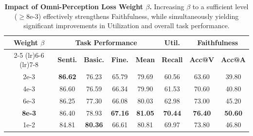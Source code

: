 \documentclass{article}
\theoremstyle{plain}
\theoremstyle{definition}
\theoremstyle{remark}
\begin{document}
\begin{table}[t]
\centering

\fontsize{8.0}{10}\selectfont 
\renewcommand{\arraystretch}{1.2}
\setlength{\tabcolsep}{3.2pt}

\caption{\textbf{Impact of Omni-Perception Loss Weight $\beta$.} Increasing $\beta$ to a sufficient level ($\ge 8\text{e-}3$) effectively strengthens Faithfulness, while simultaneously yielding significant improvements in Utilization and overall task performance.}
\label{tab:ablation_beta}

\begin{tabular}{c c c c c c c c}
    \toprule

    \multirow{2}{*}{\textbf{Weight $\beta$}} 
    & \multicolumn{4}{c}{\textbf{Task Performance}} 
    & \textbf{Util.} 
    & \multicolumn{2}{c}{\textbf{Faithfulness}} \\
    \cmidrule(lr){2-5}
    \cmidrule(lr){6-6}
    \cmidrule(lr){7-8}
    
    & \textbf{Senti.} 
    & \textbf{Basic.} 
    & \textbf{Fine.} 
    & \textbf{Mean} 
    & \textbf{Recall} 
    & \textbf{Acc@V} 
    & \textbf{Acc@A} \\
    \midrule
    
    2e-3  & \textbf{86.62} & 76.23 & 65.79 & 79.69 & 60.56 & 63.60 & 39.80  \\
    4e-3  & 86.60 & 76.59 & 66.34 & 79.90 & 61.53 & 70.60 & 40.80  \\
    6e-3  & 86.25 & 77.30 & 66.08 & 80.03 & 62.98 & 73.00 & 45.20  \\
    
    \rowcolor{tabhighlight} 
    \textbf{8e-3} & 86.40 & 78.93 & \textbf{67.16} & \textbf{81.05} & \textbf{70.44} & \textbf{76.40} & \textbf{50.60} \\
    
    1e-2  & 84.81 & \textbf{80.36} & 66.61 & 80.81 & 69.97 & 73.80 & 46.80 \\
    \bottomrule
\end{tabular}
\vspace{-5mm}
\end{table}



    
    
    
    
\end{document}
